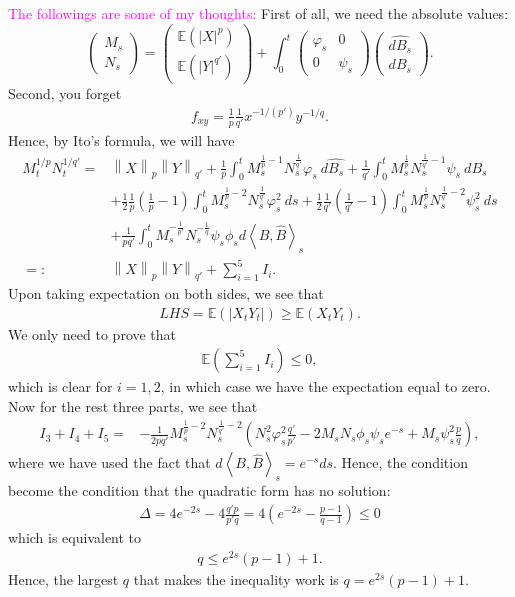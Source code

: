 \documentclass[a4paper,11pt]{article}
\numberwithin{equation}{section}
\theoremstyle{plain}
\theoremstyle{definition}
\newcommand{\E}{\mathbb{E}}
\newcommand{\Norm}[1]{\left\|  #1   \right\|}
\newcommand{\InPrd}[1]{\left\langle #1 \right\rangle}
\numberwithin{NQ}{section}
\numberwithin{LQ}{section}
\numberwithin{ZQ}{section}
\begin{document}
\bigskip
\textcolor{magenta}{The followings are some of my thoughts:}
First of all, we need the absolute values:
\[
	\begin{pmatrix}
		M_s
		\\ N_s
	\end{pmatrix}
	=
	\begin{pmatrix}
	\E(|X|^p)
	\\ \E(|Y|^{q'})
	\end{pmatrix}
	+
	\int_0^t {	\begin{pmatrix}
	\varphi_s & 0
	\\0 & \psi_s
	\end{pmatrix}
	\begin{pmatrix}
	\hat{d B_s}
	\\ d B_s
	\end{pmatrix} }.
\]
Second, you forget
\begin{align*}
	f_{xy} = \frac{1}{p} \frac{1}{q'} x^{-1/(p')} y^{-1/q}.
\end{align*}
Hence, by Ito's formula, we will have
\begin{align*}
	M_t^{1/p}N_t^{1/q'}
	= &\Norm{X}_p\Norm{Y}_{q'}
	+ \frac{1}{p}\int_0^t M_s^{\frac{1}{p}-1}N_s^{\frac{1}{q'}} \varphi_s \: d\hat{B_s}
	+ \frac{1}{q'}\int_0^t M_s^{\frac{1}{p}}N_s^{\frac{1}{q'}-1}\psi_s \: dB_s \\
	& + \frac{1}{2}\frac{1}{p} \left(\frac{1}{p}-1\right)\int_0^t M_s^{\frac{1}{p}-2}N_s^{\frac{1}{q'}}\varphi_s^2 \: ds
	+ \frac{1}{2}\frac{1}{q'} \left(\frac{1}{q'}-1\right)\int_0^t M_s^{\frac{1}{p}}N_s^{\frac{1}{q'}-2} \psi_s^2 \: ds\\
	&+\frac{1}{pq'} \int_0^t M_s^{-\frac{1}{p'}} N_s^{-\frac{1}{q}} \psi_s \phi_s d\InPrd{B,\hat{B}}_s\\
	=: & \Norm{X}_p\Norm{Y}_{q'} + \sum_{i=1}^5 I_i.
\end{align*}
Upon taking expectation on both sides, we see that
\begin{align*}
	LHS = \E\left(|X_t Y_t|\right)\ge \E\left(X_tY_t\right).
\end{align*}
We only need to prove that
\begin{align*}
	\E\left(\sum_{i=1}^5 I_i\right)\le 0,
\end{align*}
which is clear for $i=1,2$, in which case we have the expectation equal to zero.
Now for the rest three parts, we see that
\begin{align*}
	I_3+I_4+I_5
	=& -\frac{1}{2pq'} M_s^{\frac{1}{p}-2}N_s^{\frac{1}{q'}-2} \left(
		N_s^2 \varphi_s^2 \frac{q'}{p'} -2M_s N_s \phi_s \psi_s e^{-s} + M_s \psi_s^2 \frac{p}{q}
	\right),
\end{align*}
where we have used the fact that $d\InPrd{B,\hat{B}}_s=e^{-s}ds$.
Hence, the condition become the condition that the quadratic form has no solution:
\begin{align*}
	\Delta = 4 e^{-2s} -4\frac{q'p}{p'q} = 4\left(e^{-2s} - \frac{p-1}{q-1}\right)\le 0
\end{align*}
which is equivalent to
\begin{align*}
	q\le e^{2s}(p-1) +1.
\end{align*}
Hence, the largest $q$ that makes the inequality work is $q=e^{2s}(p-1) +1$.
\end{document}
